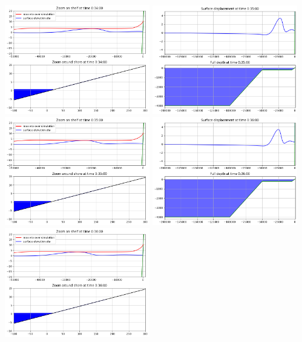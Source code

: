 \documentclass[11pt]{article}
\begin{document}
\includegraphics[width=0.475\textwidth]{frame0034fig1.png}
\vskip 10pt 
\includegraphics[width=0.475\textwidth]{frame0035fig0.png}
\includegraphics[width=0.475\textwidth]{frame0035fig1.png}
\vskip 10pt 
\includegraphics[width=0.475\textwidth]{frame0036fig0.png}
\includegraphics[width=0.475\textwidth]{frame0036fig1.png}
\end{document}
